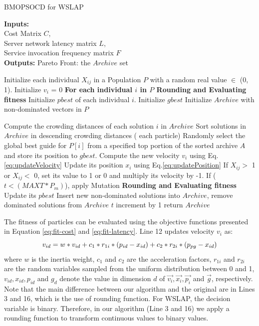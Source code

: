 \documentclass[10pt,journal,compsoc]{IEEEtran}
\begin{document}
\begin{algorithm}[!htb]
 \caption{BMOPSOCD for WSLAP}
 \footnotesize
 \textbf{Inputs:} \\
  Cost Matrix $C$, \\
  Server network latency matrix $L$, \\
  Service invocation frequency matrix $F$ \\
 \textbf{Outputs:}
  Pareto Front: the $Archive$ set

 \begin{algorithmic}[1]
  \State Initialize each individual $X_{ij}$ in a Population $P$ with a random real value $\in$ (0, 1).
  \State Initialize $v_i$ = 0
  \State \textbf{For each individual $i$ in $P$ Rounding and Evaluating fitness}
  \State Initialize $pbest$ of each individual $i$.
  \State Initialize $gbest$
  \State Initialize $Archive$ with non-dominated vectors in $P$

  \Repeat
   \State Compute the crowding distances of each solution $i$ in $Archive$
   \State Sort solutions in $Archive$ in descending crowding distances
   \For ( each particle)
    \State Randomly select the global best guide for $P[i]$ from a specified top portion of the sorted archive $A$ and store its position to $gbest$.
    \State Compute the new velocity $v_i$ using Eq.\ref{eq:updateVelocity}
    \State Update its position $x_i$ using Eq.\ref{eq:updatePosition}
    \State If $X_{ij} >$ 1 or $X_{ij} <$ 0, set its value to 1 or 0 and multiply its velocity by -1.
    \State If ($t < (MAXT * P_m)$), apply Mutation
    \State \textbf{Rounding and Evaluating fitness}
    \State Update its $pbest$
    \EndFor
  \State Insert new non-dominated solutions into $Archive$, remove dominated solutions from $Archive$
  \State $t$ increment by 1
  \State return $Archive$
 \end{algorithmic}
 \label{alg:BMOPSOCD}
\end{algorithm}

The fitness of particles can be evaluated using the objective functions presented in Equation  \ref{eq:fit-cost} and \ref{eq:fit-latency}. Line 12 updates velocity $v_i$ as:
\begin{equation}
\footnotesize
 v_{id} = w * v_{id} + c_1 * r_{1i} * (p_{id} - x_{id}) + c_2 * r_{2i} * (p_{pg} - x_{id})
\end{equation}
\noindent where $w$ is the inertia weight, $c_1$ and $c_2$ are the acceleration factors, $r_{1i}$ and $r_{2i}$ are the random variables sampled from the uniform distribution between 0 and 1, $v_{id}, x_{id}, p_{id}$ and $g_{d}$ denote the value in dimension $d$ of $\vec{v_i}, \vec{x_i},\vec{p_i}$ and $\vec{g}$, respectively.  Note that the main difference between our algorithm and the original \cite{Raquel} are in Lines 3 and 16, which is the use of rounding function. For WSLAP, the decision variable is binary. Therefore, in our algorithm (Line 3 and 16) we apply a rounding function to transform continuous values to binary values.
\end{document}

